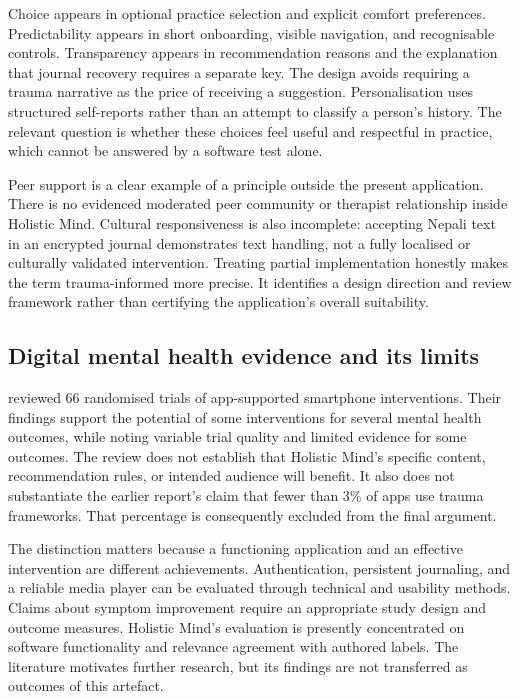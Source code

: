 Choice appears in optional practice selection and explicit comfort preferences. Predictability appears in short onboarding, visible navigation, and recognisable controls. Transparency appears in recommendation reasons and the explanation that journal recovery requires a separate key. The design avoids requiring a trauma narrative as the price of receiving a suggestion. Personalisation uses structured self-reports rather than an attempt to classify a person's history. The relevant question is whether these choices feel useful and respectful in practice, which cannot be answered by a software test alone.

Peer support is a clear example of a principle outside the present application. There is no evidenced moderated peer community or therapist relationship inside Holistic Mind. Cultural responsiveness is also incomplete: accepting Nepali text in an encrypted journal demonstrates text handling, not a fully localised or culturally validated intervention. Treating partial implementation honestly makes the term trauma-informed more precise. It identifies a design direction and review framework rather than certifying the application's overall suitability.

\subsection{Digital mental health evidence and its limits}

\citet{linardon2019} reviewed 66 randomised trials of app-supported smartphone interventions. Their findings support the potential of some interventions for several mental health outcomes, while noting variable trial quality and limited evidence for some outcomes. The review does not establish that Holistic Mind's specific content, recommendation rules, or intended audience will benefit. It also does not substantiate the earlier report's claim that fewer than 3\% of apps use trauma frameworks. That percentage is consequently excluded from the final argument.

The distinction matters because a functioning application and an effective intervention are different achievements. Authentication, persistent journaling, and a reliable media player can be evaluated through technical and usability methods. Claims about symptom improvement require an appropriate study design and outcome measures. Holistic Mind's evaluation is presently concentrated on software functionality and relevance agreement with authored labels. The literature motivates further research, but its findings are not transferred as outcomes of this artefact.

